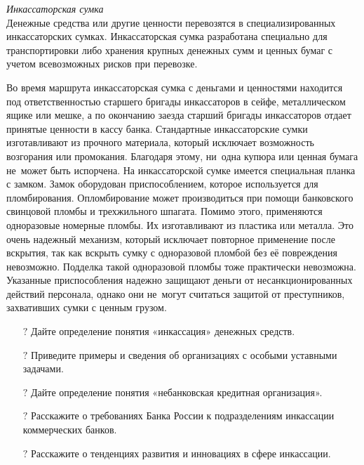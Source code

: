 \documentclass[a4paper,12pt,fleqn]{article} %
\begin{document}
\textit{Инкассаторская сумка}\\

Денежные средства или другие ценности перевозятся в специализированных инкассаторских сумках. Инкассаторская сумка разработана специально для транспортировки либо хранения крупных денежных сумм и ценных бумаг с учетом всевозможных рисков при перевозке. 

Во время маршрута инкассаторская сумка с деньгами и ценностями находится под ответственностью старшего бригады инкассаторов в сейфе, металлическом ящике или мешке, а по окончанию заезда старший бригады инкассаторов отдает принятые ценности в кассу банка. Стандартные инкассаторские сумки изготавливают из прочного материала, который исключает возможность возгорания или промокания. Благодаря этому, ни~одна купюра или ценная бумага не~может быть испорчена. 	На инкассаторской сумке имеется специальная планка с замком. Замок оборудован приспособлением, которое используется для пломбирования. Опломбирование может производиться при помощи банковского свинцовой пломбы и трехжильного шпагата. Помимо этого, применяются одноразовые номерные пломбы. Их изготавливают из пластика или металла. Это очень надежный механизм, который исключает повторное применение после вскрытия, так как вскрыть сумку с одноразовой пломбой без её повреждения невозможно. Подделка такой одноразовой пломбы тоже практически невозможна. Указанные приспособления надежно защищают деньги от несанкционированных действий персонала, однако они не~могут считаться защитой от преступников, захвативших сумки с ценным грузом.\\

\begin{tcolorbox}[colback=blue!40!red!1!,colframe=blue!40!red,enforce breakable,%
	pad at break=1mm, title=Вопросы и задания для самоконтроля]
	\begin{itemize}
		\item[{\color{blue!55!red}\Huge { $ ? $}} ]  Дайте определение понятия «инкассация» денежных средств.
		\item[{\color{blue!55!red}\Huge {  $ ? $}} ] Приведите примеры и сведения об организациях с особыми уставными задачами.
		\item[{\color{blue!55!red}\Huge {  $ ? $}} ] Дайте определение понятия «небанковская кредитная организация».
		\item[{\color{blue!55!red}\Huge {  $ ? $}} ] Расскажите о требованиях Банка России к подразделениям инкассации коммерческих банков.
		\item[{\color{blue!55!red}\Huge {  $ ? $}} ] 
		Расскажите о тенденциях развития и инновациях в сфере инкассации.
	\end{itemize}		
\end{tcolorbox}
\end{document}
